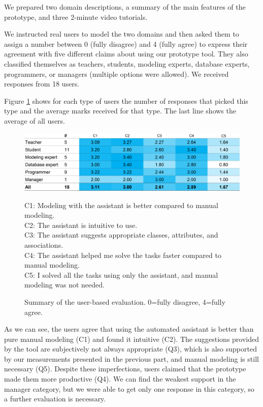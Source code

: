 We prepared two domain descriptions, a summary of the main features of the prototype, and three 2-minute video tutorials.

We instructed real users to model the two domains and then asked them to assign a number between 0 (fully disagree) and 4 (fully agree) to express their agreement with five different claims about using our prototype tool.
They also classified themselves as teachers, students, modeling experts, database experts, programmers, or managers (multiple options were allowed).
We received responses from 18 users.

Figure \ref{fig:user-based-evaluation} shows for each type of users the number of responses that picked this type and the average marks received for that type. The last line shows the average of all users.

\begin{figure}[!h]
    \includegraphics[width=1\linewidth]{img/user-based-evaluation.png} \\
    \scriptsize
\raggedright{C1: Modeling with the assistant is better compared to manual modeling. \\
C2: The assistant is intuitive to use.\\
C3: The assistant suggests appropriate classes, attributes, and associations.\\
C4: The assistant helped me solve the tasks faster compared to manual modeling.\\
C5: I solved all the tasks using only the assistant, and manual modeling was not needed.}
    \caption{Summary of the user-based evaluation. 0=fully disagree, 4=fully agree.}
    \label{fig:user-based-evaluation}
\end{figure}

As we can see, the users agree that using the automated assistant is better than pure manual modeling (C1) and found it intuitive (C2).
The suggestions provided by the tool are subjectively not always appropriate (Q3), which is also supported by our measurements presented in the previous part, and manual modeling is still necessary (Q5).
Despite these imperfections, users claimed that the prototype made them more productive (Q4).
We can find the weakest support in the manager category, but we were able to get only one response in this category, so a further evaluation is necessary.